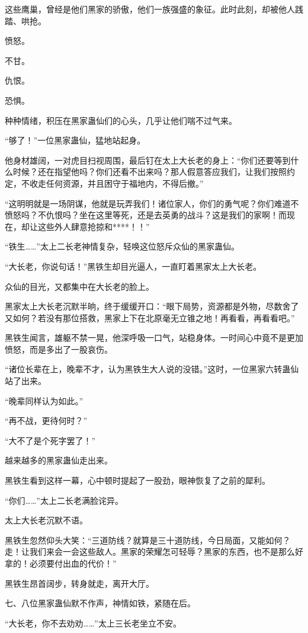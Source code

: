 \begin{this_body}
这些鹰巢，曾经是他们黑家的骄傲，他们一族强盛的象征。此时此刻，却被他人践踏、哄抢。

愤怒。

不甘。

仇恨。

恐惧。

种种情绪，积压在黑家蛊仙们的心头，几乎让他们喘不过气来。

“够了！”一位黑家蛊仙，猛地站起身。

他身材雄阔，一对虎目扫视周围，最后钉在太上大长老的身上：“你们还要等到什么时候？还在指望他吗？你们还看不出来吗？那人假意答应我们，让我们按照约定，不收走任何资源，并且困守于福地内，不得后撤。”

“这明明就是一场阴谋，他就是玩弄我们！诸位家人，你们的勇气呢？你们难道不愤怒吗？不仇恨吗？坐在这里等死，还是去英勇的战斗？这是我们的家啊！而现在，却让这些外人肆意抢掠和****！！”

“铁生……”太上二长老神情复杂，轻唤这位怒斥众仙的黑家蛊仙。

“大长老，你说句话！”黑铁生却目光逼人，一直盯着黑家太上大长老。

众仙的目光，又都集中在大长老的脸上。

黑家太上大长老沉默半晌，终于缓缓开口：“眼下局势，资源都是外物，尽数舍了又如何？若没有那位搭救，黑家上下在北原毫无立锥之地！再看看，再看看吧。”

黑铁生闻言，雄躯不禁一晃，他深呼吸一口气，站稳身体。一时间心中竟不是更加愤怒，而是多出了一股哀伤。

“诸位长辈在上，晚辈不才，认为黑铁生大人说的没错。”这时，一位黑家六转蛊仙站了出来。

“晚辈同样认为如此。”

“再不战，更待何时？”

“大不了是个死字罢了！”

越来越多的黑家蛊仙走出来。

黑铁生看到这样一幕，心中顿时提起了一股劲，眼神恢复了之前的犀利。

“你们……”太上二长老满脸诧异。

太上大长老沉默不语。

黑铁生忽然仰头大笑：“三道防线？就算是三十道防线，今日局面，又能如何？走！让我们来会一会这些敌人。黑家的荣耀怎可轻辱？黑家的东西，也不是那么好拿的！必须要付出血的代价！”

黑铁生昂首阔步，转身就走，离开大厅。

七、八位黑家蛊仙默不作声，神情如铁，紧随在后。

“大长老，你不去劝劝……”太上三长老坐立不安。


\end{this_body}
